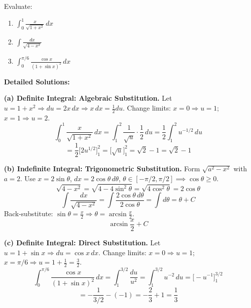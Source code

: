 \documentclass[11pt]{article}
\begin{document}
\begin{exoresolu}
Evaluate:
\begin{enumerate}
    \item $\displaystyle \int_0^1 \frac{x}{\sqrt{1+x^2}}\,dx$
    \item $\displaystyle \int \frac{dx}{\sqrt{4 - x^2}}$
    \item $\displaystyle \int_0^{\pi/6} \frac{\cos x}{(1+\sin x)^2}\,dx$
\end{enumerate}
\tcblower
\textbf{Detailed Solutions:}

\textbf{(a) Definite Integral: Algebraic Substitution.}
Let $u = 1+x^2 \Rightarrow du = 2x\,dx \Rightarrow x\,dx = \frac{1}{2}du$.
Change limits: $x=0 \Rightarrow u=1$; $x=1 \Rightarrow u=2$.
\[
\int_0^1 \frac{x}{\sqrt{1+x^2}}\,dx = \int_1^2 \frac{1}{\sqrt{u}}\cdot\frac{1}{2}\,du = \frac{1}{2}\int_1^2 u^{-1/2}\,du
\]
\[
= \frac{1}{2}\Big[ 2u^{1/2} \Big]_1^2 = \Big[ \sqrt{u} \Big]_1^2 = \sqrt{2} - 1 = \boxed{\sqrt{2} - 1}
\]

\textbf{(b) Indefinite Integral: Trigonometric Substitution.}
Form $\sqrt{a^2 - x^2}$ with $a=2$. Use $x = 2\sin\theta$, $dx = 2\cos\theta\,d\theta$, $\theta \in [-\pi/2, \pi/2] \implies \cos\theta \ge 0$.
\[
\sqrt{4-x^2} = \sqrt{4-4\sin^2\theta} = \sqrt{4\cos^2\theta} = 2\cos\theta
\]
\[
\int \frac{dx}{\sqrt{4-x^2}} = \int \frac{2\cos\theta\,d\theta}{2\cos\theta} = \int d\theta = \theta + C
\]
Back-substitute: $\sin\theta = \frac{x}{2} \Rightarrow \theta = \arcsin\frac{x}{2}$.
\[
\boxed{\arcsin\frac{x}{2} + C}
\]

\textbf{(c) Definite Integral: Direct Substitution.}
Let $u = 1+\sin x \Rightarrow du = \cos x\,dx$.
Change limits: $x=0 \Rightarrow u=1$; $x=\pi/6 \Rightarrow u=1+\frac{1}{2}=\frac{3}{2}$.
\[
\int_0^{\pi/6} \frac{\cos x}{(1+\sin x)^2}\,dx = \int_1^{3/2} \frac{du}{u^2} = \int_1^{3/2} u^{-2}\,du = \Big[ -u^{-1} \Big]_1^{3/2}
\]
\[
= -\frac{1}{3/2} - (-1) = -\frac{2}{3} + 1 = \boxed{\frac{1}{3}}
\]
\end{exoresolu}
\end{document}
